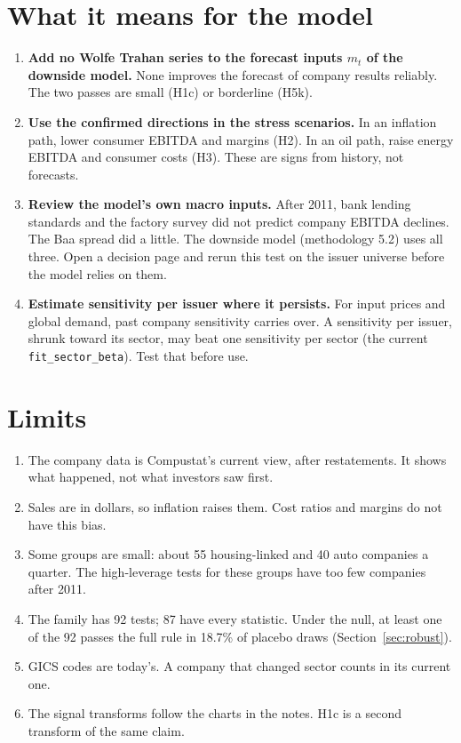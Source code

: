 \documentclass[11pt,a4paper]{article}
\newcommand{\code}[1]{\texttt{\small #1}}
\begin{document}
\section{What it means for the model}
\begin{enumerate}
\item \textbf{Add no Wolfe Trahan series to the forecast inputs $m_t$ of the downside model.} None improves the forecast of company results reliably. The two passes are small (H1c) or borderline (H5k).
\item \textbf{Use the confirmed directions in the stress scenarios.} In an inflation path, lower consumer EBITDA and margins (H2). In an oil path, raise energy EBITDA and consumer costs (H3). These are signs from history, not forecasts.
\item \textbf{Review the model's own macro inputs.} After 2011, bank lending standards and the factory survey did not predict company EBITDA declines. The Baa spread did a little. The downside model (methodology 5.2) uses all three. Open a decision page and rerun this test on the issuer universe before the model relies on them.
\item \textbf{Estimate sensitivity per issuer where it persists.} For input prices and global demand, past company sensitivity carries over. A sensitivity per issuer, shrunk toward its sector, may beat one sensitivity per sector (the current \code{fit\_sector\_beta}). Test that before use.
\end{enumerate}

\section{Limits}
\begin{enumerate}
\item The company data is Compustat's current view, after restatements. It shows what happened, not what investors saw first.
\item Sales are in dollars, so inflation raises them. Cost ratios and margins do not have this bias.
\item Some groups are small: about 55 housing-linked and 40 auto companies a quarter. The high-leverage tests for these groups have too few companies after 2011.
\item The family has 92 tests; 87 have every statistic. Under the null, at least one of the 92 passes the full rule in 18.7\% of placebo draws (Section~\ref{sec:robust}).
\item GICS codes are today's. A company that changed sector counts in its current one.
\item The signal transforms follow the charts in the notes. H1c is a second transform of the same claim.
\end{enumerate}
\end{document}
